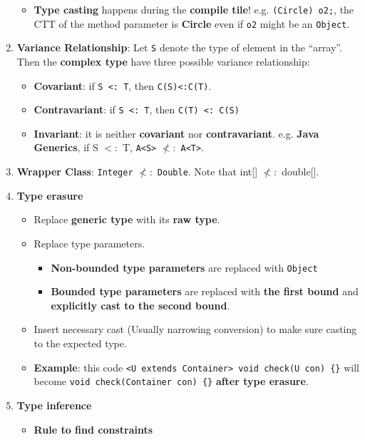 \documentclass[10pt, landscape]{article}
\begin{document}
\begin{multicols}{4}
\begin{enumerate}
\begin{itemize}
        \item \textbf{Type casting} happens during the \textbf{compile tile}! e.g. \texttt{(Circle) o2;}, the CTT of the method parameter is \textbf{Circle} even if \texttt{o2} might be an \texttt{Object}.
    \end{itemize}
    \item \textbf{Variance Relationship}: Let \texttt{S} denote the type of element in the ``array''. Then the \textbf{complex type} have three possible variance relationship:
    \begin{itemize}
        \item \textbf{Covariant}: if \texttt{S <: T}, then \texttt{C(S)<:C(T)}.
        \item \textbf{Contravariant}: if \texttt{S <: T}, then \texttt{C(T) <: C(S)}
        \item \textbf{Invariant}: it is neither \textbf{covariant} nor \textbf{contravariant}. e.g. \textbf{Java Generics}, if S $<:$ T, \texttt{A<S>} $\nless:$ \texttt{A<T>}.
    \end{itemize}
    \item \textbf{Wrapper Class}: \texttt{Integer} $\nless:$ \texttt{Double}. Note that int[] $\nless:$ double[].
    \item \textbf{Type erasure}
    \begin{itemize}
        \item Replace \textbf{generic type} with its \textbf{raw type}.
        \item Replace type parameters.
        \begin{itemize}
            \item \textbf{Non-bounded type parameters} are replaced with \texttt{Object}
            \item \textbf{Bounded type parameters} are replaced with \textbf{the first bound} and \textbf{explicitly cast to the second bound}.
        \end{itemize}
        \item Insert necessary cast (Usually narrowing conversion) to make sure casting to the expected type.
        \item \textbf{Example}: this code \texttt{<U extends Container> void check(U con) \{\}} will become \texttt{void check(Container con) \{\}} \textbf{after type erasure}.
    \end{itemize}
    \item \textbf{Type inference}
    \begin{itemize}
        \item \textbf{Rule to find constraints}

\end{itemize}
\end{enumerate}
\end{multicols}
\end{document}
